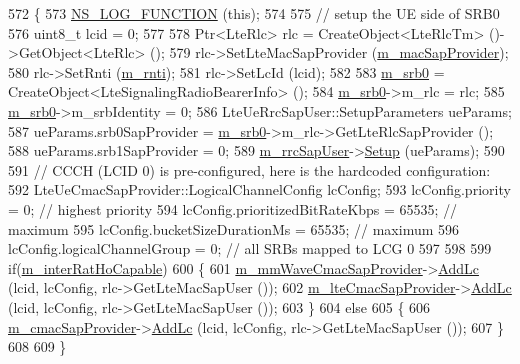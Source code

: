 \begin{DoxyCode}
572 \{
573   \hyperlink{log-macros-disabled_8h_a90b90d5bad1f39cb1b64923ea94c0761}{NS\_LOG\_FUNCTION} (\textcolor{keyword}{this});
574 
575   \textcolor{comment}{// setup the UE side of SRB0}
576   uint8\_t lcid = 0;
577 
578   Ptr<LteRlc> rlc = CreateObject<LteRlcTm> ()->GetObject<LteRlc> ();
579   rlc->SetLteMacSapProvider (\hyperlink{classns3_1_1LteUeRrc_a194a22ce682adab02b0e9d2fc71fda48}{m\_macSapProvider});
580   rlc->SetRnti (\hyperlink{classns3_1_1LteUeRrc_a8e078d8ef0ad23e670fe2ef08caab84f}{m\_rnti});
581   rlc->SetLcId (lcid);
582 
583   \hyperlink{classns3_1_1LteUeRrc_a1ed76d4e424d770de67c3e39f516ac4d}{m\_srb0} = CreateObject<LteSignalingRadioBearerInfo> ();
584   \hyperlink{classns3_1_1LteUeRrc_a1ed76d4e424d770de67c3e39f516ac4d}{m\_srb0}->m\_rlc = rlc;
585   \hyperlink{classns3_1_1LteUeRrc_a1ed76d4e424d770de67c3e39f516ac4d}{m\_srb0}->m\_srbIdentity = 0;
586   LteUeRrcSapUser::SetupParameters ueParams;
587   ueParams.srb0SapProvider = \hyperlink{classns3_1_1LteUeRrc_a1ed76d4e424d770de67c3e39f516ac4d}{m\_srb0}->m\_rlc->GetLteRlcSapProvider ();
588   ueParams.srb1SapProvider = 0;
589   \hyperlink{classns3_1_1LteUeRrc_a9636e38d20aa1d75c9423d43648f2a1a}{m\_rrcSapUser}->\hyperlink{classns3_1_1LteUeRrcSapUser_a28a36243a98bfc598df870cd2fadbf85}{Setup} (ueParams);
590 
591   \textcolor{comment}{// CCCH (LCID 0) is pre-configured, here is the hardcoded configuration:}
592   LteUeCmacSapProvider::LogicalChannelConfig lcConfig;
593   lcConfig.priority = 0; \textcolor{comment}{// highest priority}
594   lcConfig.prioritizedBitRateKbps = 65535; \textcolor{comment}{// maximum}
595   lcConfig.bucketSizeDurationMs = 65535; \textcolor{comment}{// maximum}
596   lcConfig.logicalChannelGroup = 0; \textcolor{comment}{// all SRBs mapped to LCG 0}
597 
598   
599   \textcolor{keywordflow}{if}(\hyperlink{classns3_1_1LteUeRrc_a0702e1a453de2d8f1c454fea344ef4f0}{m\_interRatHoCapable})
600   \{
601     \hyperlink{classns3_1_1LteUeRrc_ac48418b0f235043204868e73c073ec0b}{m\_mmWaveCmacSapProvider}->\hyperlink{classns3_1_1LteUeCmacSapProvider_a62f2d731c336ca14e98e95a3215e92ec}{AddLc} (lcid, lcConfig, rlc->GetLteMacSapUser ());
602     \hyperlink{classns3_1_1LteUeRrc_acc0eaf7cf5a1ec8706f57b8164fcad4f}{m\_lteCmacSapProvider}->\hyperlink{classns3_1_1LteUeCmacSapProvider_a62f2d731c336ca14e98e95a3215e92ec}{AddLc} (lcid, lcConfig, rlc->GetLteMacSapUser ());
603   \}
604   \textcolor{keywordflow}{else}
605   \{
606     \hyperlink{classns3_1_1LteUeRrc_a5a7bffd2040d73eb5db1aaef849d0396}{m\_cmacSapProvider}->\hyperlink{classns3_1_1LteUeCmacSapProvider_a62f2d731c336ca14e98e95a3215e92ec}{AddLc} (lcid, lcConfig, rlc->GetLteMacSapUser ());
607   \}
608 
609 \}
\end{DoxyCode}


